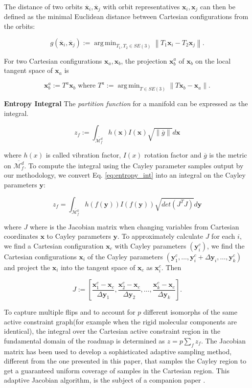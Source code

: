 \documentclass[]{article}
\DeclareMathOperator*{\argmin}{\arg\,\min}
\def\yy{\mathbf{y}}
\newcommand{\acgW}{active constraint graph}
\newcommand{\rmc}{rigid molecular component}
\newcommand{\bx}{\mathbf{x}}
\newcommand{\Mn}{\mathcal{M}}
\begin{document}
The distance of two orbits $\overline{\bx}_i, \overline{\bx}_j$ with orbit
representatives $\bx_i, \bx_j$ can then be defined as the minimal Euclidean
distance between Cartesian configurations from the orbits:

\[
   g(\overline{\bx}_i, \overline{\bx}_j) 
   := \argmin_{T_1, T_2 \in SE(3)} \left\|T_1 \bx_i - T_2 \bx_j\right\|.
\]

For two Cartesian configurations $\bx_a, \bx_b$, the projection $\bx^a_b$
of $\bx_b$ on the local tangent space of $\bx_a$ is

\[
   \bx^a_b := T^a \bx_b \text{ where } 
   T^a := \argmin_{T \in SE(3)}
   \left\|T \bx_b - \bx_a\right\|.
\]

\noindent\textbf{Entropy Integral} The \emph{partition function} for a manifold can be expressed as the
integral\cite{Holmes-Cerfon2013}.


\begin{equation}
   z_f := \int_{\overline{\Mn^d_f}}
   h(\bx) I(\bx) \sqrt{\left\| \overline{g}\right\|} d\bx
\label{eq:entropy_int}
\end{equation}

\noindent where $h(x)$ is called vibration factor, $I(x)$ rotation factor and
$\overline{g}$ is the metric on $\overline{\Mn^d_f}$. To compute the integral using the Cayley parameter samples output by our
methodology, we convert Eq. \eqref{eq:entropy_int} into an integral on the Cayley parameters
$\yy$:

\begin{equation}
\label{eq:entropy_int_2}
z_f = \int_{\overline{\Mn^k_f}} h(f(\yy)) I(f(\yy)) \sqrt{det(J^T J)} d\yy
\end{equation}


\noindent where $J$ where is the Jacobian matrix when changing variables from Cartesian
coordinates $\bx$ to Cayley parameters $\yy$. To approximately calculate $J$
for each $i$, we find a Cartesian configuration $\bx_c$ with Cayley parameters $(\yy^c_i)$, we find the
Cartesian configurations $\bx_i$ of the Cayley parameters $(\yy^c_1, \dots, \yy^c_i +
\Delta \yy_i, \dots, \yy^c_k)$ and project the $\bx_i$ into the tangent space
of $\bx_c$ as $\bx^c_i$. Then 

\[
   J := \left[ 
   \frac{\bx^c_1-\bx_c}{\Delta \yy_1}, \frac{\bx^c_2-\bx_c}{\Delta \yy_2}, 
   \dots, \frac{\bx^c_k-\bx_c}{\Delta \yy_k} \right].
\]

To capture multiple flips and to account for $p$ different
isomorphs of the same \acgW (for example when the \rmc s are identical), 
the integral over the Cartesian active constraint region in
the fundamental domain of the roadmap is 
determined as $ z = p \sum_f z_f $. 
The Jacobian
matrix has been used to develop a sophisticated adaptive sampling method,
different from the one presented in this paper, that samples the Cayley region
to get a guaranteed uniform coverage of samples in the Cartesian region. This 
adaptive Jacobian algorithm, is the subject of a companion paper \cite{Ozkan2014Jacobian}.
\end{document}
